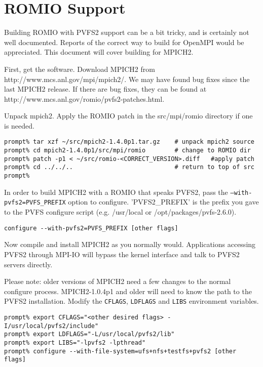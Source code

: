\documentclass[11pt, letterpaper]{article}
\begin{document}
\section{ROMIO Support}
\label{sec:romio}

Building ROMIO with PVFS2 support can be a bit tricky, and is certainly not
well documented.  Reports of the correct way to build for OpenMPI would be
appreciated.  This document will cover building for MPICH2. 

First, get the software.  Download MPICH2 from
http://www.mcs.anl.gov/mpi/mpich2/.  We may have found bug fixes since the last MPICH2 release.  If there are bug fixes, they can be found at
http://www.mcs.anl.gov/romio/pvfs2-patches.html. 

Unpack mpich2. Apply the ROMIO patch in the src/mpi/romio directory if one is
needed. 

\begin{verbatim}
prompt% tar xzf ~/src/mpich2-1.4.0p1.tar.gz    # unpack mpich2 source
prompt% cd mpich2-1.4.0p1/src/mpi/romio        # change to ROMIO dir
prompt% patch -p1 < ~/src/romio-<CORRECT_VERSION>.diff   #apply patch
prompt% cd ../../..                            # return to top of src
prompt% 
\end{verbatim}

In order to build MPICH2 with a ROMIO that speaks PVFS2, pass the
\texttt{--with-pvfs2=PVFS\_PREFIX} option to configure.  'PVFS2\_PREFIX' is the
prefix you gave to the PVFS configure script (e.g. /usr/local or
/opt/packages/pvfs-2.6.0).  

\begin{verbatim}
configure --with-pvfs2=PVFS_PREFIX [other flags]
\end{verbatim}

Now compile and install MPICH2 as you normally would.  Applications accessing
PVFS2 through MPI-IO will bypass the kernel interface and talk to PVFS2 servers
directly.  

Please note: older versions of MPICH2 need a few changes
to the normal configure process.  MPICH2-1.0.4p1 and older will need to
know the path to the PVFS2 installation.  Modify the {\tt CFLAGS},
{\tt LDFLAGS} and {\tt LIBS} environment variables.

\begin{verbatim}
prompt% export CFLAGS="<other desired flags> -I/usr/local/pvfs2/include"
prompt% export LDFLAGS="-L/usr/local/pvfs2/lib"
prompt% export LIBS="-lpvfs2 -lpthread"
prompt% configure --with-file-system=ufs+nfs+testfs+pvfs2 [other flags]
\end{verbatim}
\end{document}
